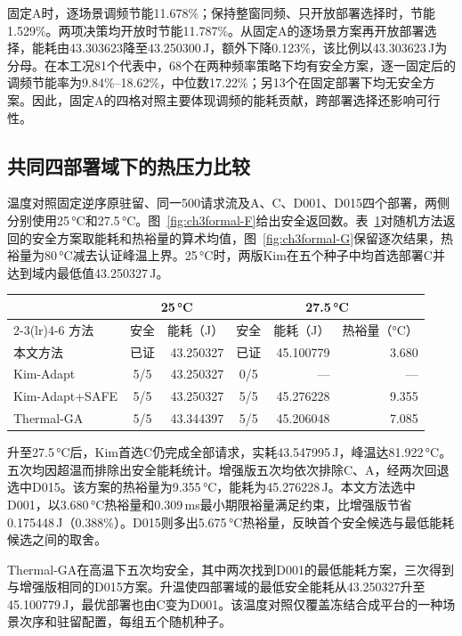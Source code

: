 固定A时，逐场景调频节能11.678\%；保持整窗同频、只开放部署选择时，节能1.529\%。两项决策均开放时节能11.787\%。从固定A的逐场景方案再开放部署选择，能耗由43.303623降至43.250300\,J，额外下降0.123\%，该比例以43.303623\,J为分母。在本工况81个代表中，68个在两种频率策略下均有安全方案，逐一固定后的调频节能率为9.84\%--18.62\%，中位数17.22\%；另13个在固定部署下均无安全方案。因此，固定A的四格对照主要体现调频的能耗贡献，跨部署选择还影响可行性。

\ChThreeGroupBreak
\subsection{共同四部署域下的热压力比较}
温度对照固定逆序原驻留、同一500请求流及A、C、D001、D015四个部署，两侧分别使用25\,°C和27.5\,°C。图~\ref{fig:ch3formal-F}给出安全返回数。表~\ref{tab:ch3formal-pressure}对随机方法返回的安全方案取能耗和热裕量的算术均值，图~\ref{fig:ch3formal-G}保留逐次结果，热裕量为80\,°C减去认证峰温上界。25\,°C时，两版Kim在五个种子中均首选部署C并达到域内最低值43.250327\,J。

\begin{table}\centering
{}
\label{tab:ch3formal-pressure}
\small\setlength{\tabcolsep}{4pt}
\begin{tabular}{lcrcrr}\toprule
& \multicolumn{2}{c}{25\,°C} & \multicolumn{3}{c}{27.5\,°C}\\
\cmidrule(lr){2-3}\cmidrule(lr){4-6}
方法 & 安全 & 能耗（J） & 安全 & 能耗（J） & 热裕量（°C）\\\midrule
本文方法 & 已证 & 43.250327 & 已证 & 45.100779 & 3.680\\
Kim-Adapt & 5/5 & 43.250327 & 0/5 & --- & ---\\
Kim-Adapt+SAFE & 5/5 & 43.250327 & 5/5 & 45.276228 & 9.355\\
Thermal-GA & 5/5 & 43.344397 & 5/5 & 45.206048 & 7.085\\\bottomrule
\end{tabular}
\end{table}

升至27.5\,°C后，Kim首选C仍完成全部请求，实耗43.547995\,J，峰温达81.922\,°C。五次均因超温而排除出安全能耗统计。增强版五次均依次排除C、A，经两次回退选中D015。该方案的热裕量为9.355\,°C，能耗为45.276228\,J。本文方法选中D001，以3.680\,°C热裕量和0.309\,ms最小期限裕量满足约束，比增强版节省0.175448\,J（0.388\%）。D015则多出5.675\,°C热裕量，反映首个安全候选与最低能耗候选之间的取舍。

Thermal-GA在高温下五次均安全，其中两次找到D001的最低能耗方案，三次得到与增强版相同的D015方案。升温使四部署域的最低安全能耗从43.250327升至45.100779\,J，最优部署也由C变为D001。该温度对照仅覆盖冻结合成平台的一种场景次序和驻留配置，每组五个随机种子。
\endgroup
